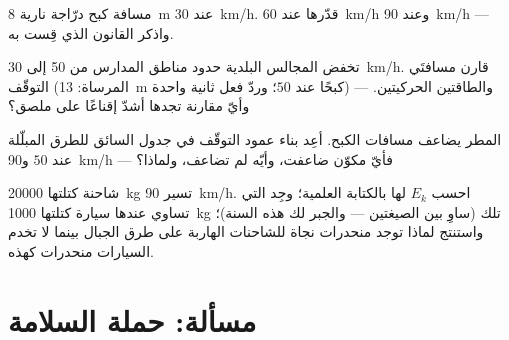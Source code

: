 \begin{exercise}[$\star\star$]\label{exo:g9:kinetic-energy-safety:9}
مسافة كبح درّاجة نارية \qty{8}{m} عند \qty{30}{km/h}. قدّرها
عند \qty{60}{km/h} وعند \qty{90}{km/h} --- واذكر القانون الذي
قِست به.
\end{exercise}

\begin{exercise}[$\star\star$]\label{exo:g9:kinetic-energy-safety:10}
تخفض المجالس البلدية حدود مناطق المدارس من \qty{50}{} إلى
\qty{30}{km/h}. قارن مسافتَي التوقّف (المرساة: \qty{13}{m}
كبحًا عند $50$؛ وردّ فعل ثانية واحدة) --- والطاقتين
الحركيتين. وأيّ مقارنة تجدها أشدّ إقناعًا على ملصق؟
\end{exercise}

\begin{exercise}[$\star\star$]\label{exo:g9:kinetic-energy-safety:11}
المطر يضاعف مسافات الكبح. أعِد بناء عمود التوقّف في جدول
السائق للطرق المبلّلة عند $50$ و\qty{90}{km/h} --- فأيّ
مكوّن ضاعفت، وأيّه لم تضاعف، ولماذا؟
\end{exercise}

\begin{exercise}[$\star\star\star$]\label{exo:g9:kinetic-energy-safety:12}
شاحنة كتلتها \qty{20000}{kg} تسير  \qty{90}{km/h}. احسب
$E_k$ لها بالكتابة العلمية؛ وجِد  التي تساوي عندها
سيارة كتلتها \qty{1000}{kg} تلك  (ساوِ بين الصيغتين ---
والجبر لك هذه السنة)؛ واستنتج لماذا توجد منحدرات نجاة
للشاحنات الهاربة على طرق الجبال بينما لا تخدم السيارات
منحدرات كهذه.
\end{exercise}

\section{مسألة: حملة السلامة}

